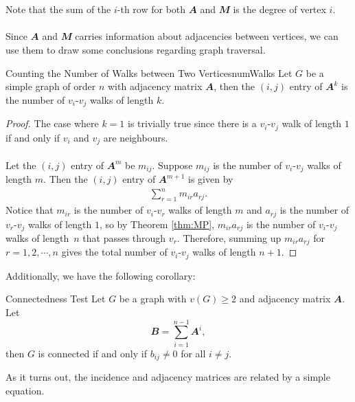 \documentclass[math, code]{amznotes}
\theoremstyle{remark}
\begin{document}
\\\\
Note that the sum of the $i$-th row for both $\mathbfit{A}$ and $\mathbfit{M}$ is the degree of vertex $i$. 
\\\\
Since $\mathbfit{A}$ and $\mathbfit{M}$ carries information about adjacencies between vertices, we can use them to draw some conclusions regarding graph traversal.
\begin{probox}{Counting the Number of Walks between Two Vertices}{numWalks}
    Let $G$ be a simple graph of order $n$ with adjacency matrix $\mathbfit{A}$, then the $(i, j)$ entry of $\mathbfit{A}^k$ is the number of $v_i$-$v_j$ walks of length $k$.
    \tcblower   
    \begin{proof}
        The case where $k = 1$ is trivially true since there is a $v_i$-$v_j$ walk of length $1$ if and only if $v_i$ and $v_j$ are neighbours.
        \\\\
        Let the $(i, j)$ entry of $\mathbfit{A}^m$ be $m_{ij}$. Suppose $m_{ij}$ is the number of $v_i$-$v_j$ walks of length $m$. Then the $(i, j)$ entry of $\mathbfit{A}^{m + 1}$ is given by
        \begin{align*}
            \sum_{r = 1}^{n}m_{ir}a_{rj}.
        \end{align*}
        Notice that $m_{ir}$ is the number of $v_i$-$v_r$ walks of length $m$ and $a_{rj}$ is the number of $v_r$-$v_j$ walks of length $1$, so by Theorem \ref{thm:MP}, $m_{ir}a_{rj}$ is the number of $v_i$-$v_j$ walks of length~$n$ that passes through $v_r$. Therefore, summing up $m_{ir}a_{rj}$ for $r = 1, 2, \cdots, n$ gives the total number of $v_i$-$v_j$ walks of length $n + 1$.
    \end{proof}
\end{probox}
Additionally, we have the following corollary:
\begin{corbox}{Connectedness Test}{}
    Let $G$ be a graph with $v(G) \geq 2$ and adjacency matrix $\mathbfit{A}$. Let
    \begin{equation*}
        \mathbfit{B} = \sum_{i = 1}^{n - 1}\mathbfit{A}^i,
    \end{equation*}
    then $G$ is connected if and only if $b_{ij} \neq 0$ for all $i \neq j$.
\end{corbox}
As it turns out, the incidence and adjacency matrices are related by a simple equation.
\end{document}
